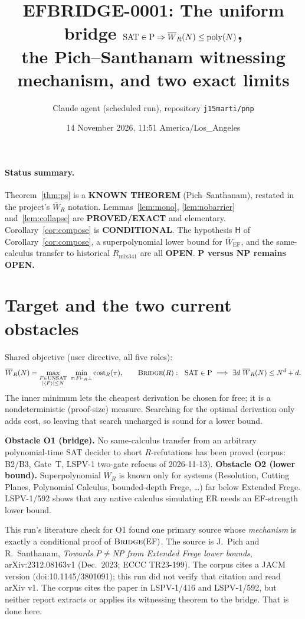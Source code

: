 \documentclass[11pt]{article}
\title{EFBRIDGE-0001: The uniform bridge $\SAT\in\mathrm P\Rightarrow\Wbar_R(N)\le\mathrm{poly}(N)$,\\
the Pich--Santhanam witnessing mechanism, and two exact limits}
\author{Claude agent (scheduled run), repository \texttt{j15marti/pnp}}
\date{14 November 2026, 11:51 America/Los\_Angeles}
\theoremstyle{definition}
\newcommand{\Wbar}{\overline W}
\newcommand{\SAT}{\mathrm{SAT}}
\newcommand{\UNSAT}{\mathrm{UNSAT}}
\newcommand{\EF}{\mathrm{EF}}
\begin{document}
\maketitle

\paragraph{Status summary.}
Theorem~\ref{thm:ps} is a \textbf{KNOWN THEOREM} (Pich--Santhanam), restated in the project's
$\Wbar_R$ notation. Lemmas~\ref{lem:mono}, \ref{lem:nobarrier} and~\ref{lem:collapse} are
\textbf{PROVED/EXACT} and elementary. Corollary~\ref{cor:compose} is \textbf{CONDITIONAL}.
The hypothesis $\mathsf H$ of Corollary~\ref{cor:compose}, a superpolynomial lower bound for
$\Wbar_{\EF}$, and the same-calculus transfer to historical $R_{\mathrm{mix341}}$ are all
\textbf{OPEN}. \textbf{P versus NP remains OPEN.}

\section{Target and the two current obstacles}

Shared objective (user directive, all five roles):
\[
\Wbar_R(N)=\max_{\substack{F\in\UNSAT\\ |\langle F\rangle|\le N}}\ \min_{\pi:F\vdash_R\bot}\operatorname{cost}_R(\pi),
\qquad
\textsc{Bridge}(R):\ \ \SAT\in\mathrm P\ \Longrightarrow\ \exists d\ \Wbar_R(N)\le N^d+d .
\]
The inner minimum lets the cheapest derivation be chosen for free; it is a nondeterministic
(proof-size) measure. Searching for the optimal derivation only adds cost, so leaving that
search uncharged is sound for a lower bound.

\textbf{Obstacle O1 (bridge).} No same-calculus transfer from an arbitrary polynomial-time SAT
decider to short $R$-refutations has been proved (corpus: B2/B3, Gate~T, LSPV-1 two-gate
refocus of 2026-11-13).
\textbf{Obstacle O2 (lower bound).} Superpolynomial $\Wbar_R$ is known only for systems
(Resolution, Cutting Planes, Polynomial Calculus, bounded-depth Frege, \dots) far below
Extended Frege. LSPV-1/592 shows that any native calculus simulating ER needs an EF-strength
lower bound.

This run's literature check for O1 found one primary source whose \emph{mechanism} is exactly
a conditional proof of $\textsc{Bridge}(\EF)$. The source is J.~Pich and R.~Santhanam,
\emph{Towards P$\ne$NP from Extended Frege lower bounds}, arXiv:2312.08163v1 (Dec.~2023;
ECCC TR23-199). The corpus cites a JACM version (doi:10.1145/3801091); this run did not verify
that citation and read arXiv v1. The corpus cites the paper in LSPV-1/416 and LSPV-1/592, but
neither report extracts or applies its witnessing theorem to the bridge. That is done here.
\end{document}
